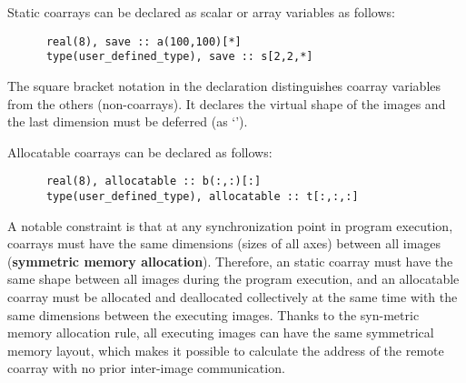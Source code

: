 Static coarrays can be declared as scalar or array variables as follows:
\begin{verbatim}
      real(8), save :: a(100,100)[*]
      type(user_defined_type), save :: s[2,2,*]
\end{verbatim}

The square bracket notation in the declaration distinguishes coarray variables from 
the others (non-coarrays). It declares the virtual shape of the images and the last 
dimension must be deferred (as `{\tt *}').

Allocatable coarrays can be declared as follows:
\begin{verbatim}
      real(8), allocatable :: b(:,:)[:]
      type(user_defined_type), allocatable :: t[:,:,:]
\end{verbatim}


A notable constraint is that at any synchronization point in program execution, 
coarrays must have the same dimensions (sizes of all axes) between all images
({\bf symmetric memory allocation}). 
Therefore, an static coarray must have the same shape between all images during 
the program execution, and an allocatable coarray must be allocated and deallocated 
collectively at the same time with the same dimensions between the executing images.
Thanks to the syn-metric memory allocation rule, all executing images can have
the same symmetrical memory layout, which makes it possible to calculate the address 
of the remote coarray with no prior inter-image communication.


